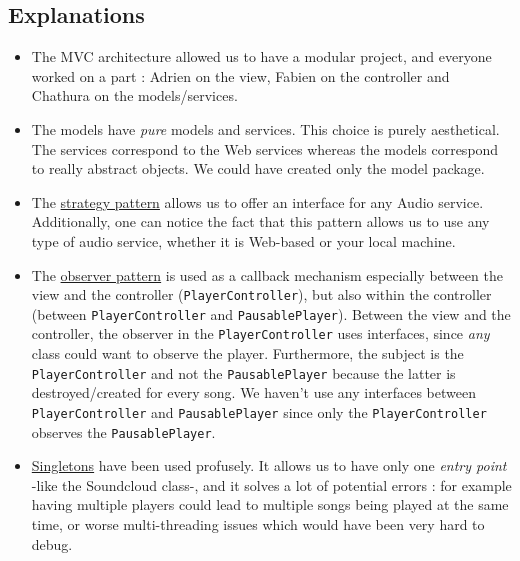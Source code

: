 \documentclass{report}
\begin{document}
\subsection{Explanations}

\begin{itemize}
\item The MVC architecture allowed us to have a modular project, and everyone worked on a part : Adrien on the view, Fabien on the controller and Chathura on the models/services. 
\item The models have \textit{pure} models and services. This choice is purely aesthetical. The services correspond to the Web services whereas the models correspond to really abstract objects. We could have created only the model package.
\item The \href{https://en.wikipedia.org/wiki/Strategy_pattern}{strategy pattern} allows us to offer an interface for any Audio service. Additionally, one can notice the fact that this pattern allows us to use any type of audio service, whether it is Web-based or your local machine.
\item The \href{https://en.wikipedia.org/wiki/Observer_pattern}{observer pattern} is used as a callback mechanism especially between the view and the controller (\texttt{PlayerController}), but also within the controller (between \texttt{PlayerController} and \texttt{PausablePlayer}). Between the view and the controller, the observer in the \texttt{PlayerController} uses interfaces, since \textit{any} class could want to observe the player. Furthermore, the subject is the \texttt{PlayerController} and not the \texttt{PausablePlayer} because the latter is destroyed/created for every song. We haven't use any interfaces between \texttt{PlayerController} and \texttt{PausablePlayer} since only the \texttt{PlayerController} observes the \texttt{PausablePlayer}.
\item \href{http://weknowmemes.com/generator/uploads/generated/g1406353714448670979.jpg}{Singletons} have been used profusely. It allows us to have only one \textit{entry point} -like the Soundcloud class-, and it solves a lot of potential errors : for example having multiple players could lead to multiple songs being played at the same time, or worse multi-threading issues which would have been very hard to debug. 
\end{itemize}

\end{document}
